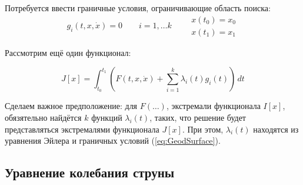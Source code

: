\documentclass[12pt]{article}
\begin{document}
		Потребуется ввести граничные условия, ограничивающие область поиска:
		\begin{equation} \label{eq:GeodSurface}
			g_i(t, x, \dot{x}) = 0 \qquad i = 1,\ldots k \qquad
			\begin{aligned}
				x(t_0) = x_0 \\
				x(t_1) = x_1
			\end{aligned}
		\end{equation}

		Рассмотрим ещё один функционал:

		$$J[x] = \int_{t_0}^{t_1} \left(F(t,x,\dot{x}) + \sum_{i=1}^k \lambda_i(t) g_i(t)\right)\,dt$$

		Сделаем важное предположение: для $F(\ldots)$, экстремали функционала $I[x]$, обязятельно найдётся
		$k$ функций $\lambda_i(t)$, таких, что решение будет представляться экстремалями функционала $J[x]$.
		При этом, $\lambda_i(t)$ находятся из уравнения Эйлера и граничных условий (\ref{eq:GeodSurface}).

	\subsection{Уравнение колебания струны}

\end{document}
